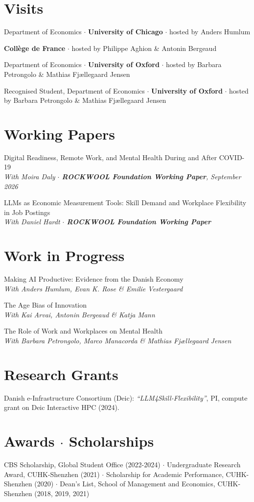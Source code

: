 \documentclass[11pt,a4paper]{article}
\newenvironment{dated}{%
  \begin{list}{}{%
    \setlength{\leftmargin}{2.75cm}\setlength{\labelwidth}{2.5cm}%
    \setlength{\labelsep}{0.25cm}\setlength{\itemsep}{1pt}%
    \setlength{\parsep}{0pt}\setlength{\topsep}{0pt}\setlength{\listparindent}{0pt}}%
}{\end{list}}
\newcommand{\entry}[2]{\item[{\makebox[2.5cm][l]{#1}}]#2}
\newcommand{\paper}[2]{\textcolor{accent}{#1}\\ {\itshape #2}\par\vspace{5pt}}
\newcommand{\block}[1]{#1\par\vspace{5pt}}
\newcommand{\sep}{ $\cdot$ }
\begin{document}
\section{Visits}
\begin{dated}
  \entry{May 2026}{Department of Economics\sep\textbf{University of Chicago}\sep hosted by Anders Humlum}
  \entry{Apr 2026}{\textbf{Coll\`ege de France}\sep hosted by Philippe Aghion \& Antonin Bergeaud}
  \entry{Mar 2026}{Department of Economics\sep\textbf{University of Oxford}\sep hosted by Barbara Petrongolo \& Mathias Fj\ae llegaard Jensen}
  \entry{Apr-Jun 2025}{Recognised Student, Department of Economics\sep\textbf{University of Oxford}\sep hosted by Barbara Petrongolo \& Mathias Fj\ae llegaard Jensen}
\end{dated}

\section{Working Papers}
\paper{Digital Readiness, Remote Work, and Mental Health During and After COVID-19}
  {With Moira Daly\sep\textbf{ROCKWOOL Foundation Working Paper}, September 2026}
\paper{LLMs as Economic Measurement Tools: Skill Demand and Workplace Flexibility in Job Postings}
  {With Daniel Hardt\sep\textbf{ROCKWOOL Foundation Working Paper}}

\section{Work in Progress}
\paper{Making AI Productive: Evidence from the Danish Economy}
  {With Anders Humlum, Evan K. Rose \& Emilie Vestergaard}
\paper{The Age Bias of Innovation}
  {With Kai Arvai, Antonin Bergeaud \& Katja Mann}
\paper{The Role of Work and Workplaces on Mental Health}
  {With Barbara Petrongolo, Marco Manacorda \& Mathias Fj\ae llegaard Jensen}

\section{Research Grants}
\block{Danish e-Infrastructure Consortium (Deic): \emph{``LLM4Skill-Flexibility''}, PI, compute grant on Deic Interactive HPC (2024).}

\section{Awards\sep Scholarships}
\block{CBS Scholarship, Global Student Office (2022-2024)\sep Undergraduate Research Award, CUHK-Shenzhen (2021)\sep Scholarship for Academic Performance, CUHK-Shenzhen (2020)\sep Dean's List, School of Management and Economics, CUHK-Shenzhen (2018, 2019, 2021)}
\end{document}
